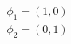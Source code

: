 \documentclass[preview]{standalone}
\begin{document}
\begin{align*}
\phi_1 = (1,0)\\ \phi_2 = (0,1)
\end{align*}
\end{document}
